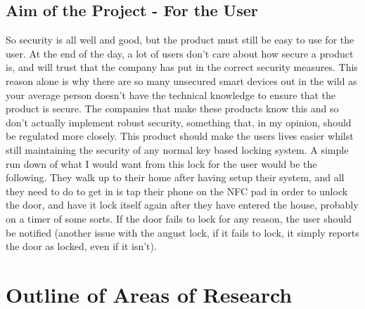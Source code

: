 \subsection{Aim of the Project - For the User}
So security is all well and good, but the product must still be easy to use for the user. At the end of the day, a lot of users don't care about how secure a product is, and will trust that the company has put in the correct security measures. This reason alone is why there are so many unsecured smart devices out in the wild as your average person doesn't have the technical knowledge to ensure that the product is secure. The companies that make these products know this and so don't actually implement robust security, something that, in my opinion, should be regulated more closely. This product should make the users lives easier whilst still maintaining the security of any normal key based locking system.
\newline
\newline
A simple run down of what I would want from this lock for the user would be the following. They walk up to their home after having setup their system, and all they need to do to get in is tap their phone on the NFC pad in order to unlock the door, and have it lock itself again after they have entered the house, probably on a timer of some sorts. If the door fails to lock for any reason, the user should be notified (another issue with the august lock, if it fails to lock, it simply reports the door as locked, even if it isn't).

\section{Outline of Areas of Research}


